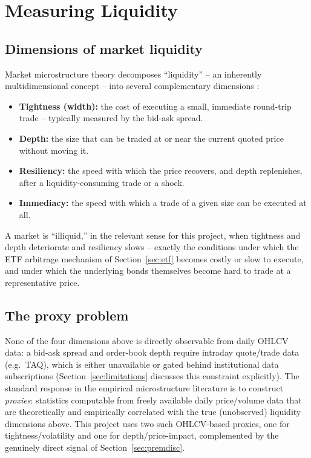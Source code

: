 \documentclass[11pt]{article}
\theoremstyle{definition}
\theoremstyle{remark}
\begin{document}
\section{Measuring Liquidity}
\label{sec:liquidity}

\subsection{Dimensions of market liquidity}

Market microstructure theory decomposes ``liquidity'' -- an inherently multidimensional concept -- into several complementary dimensions \cite{kyle1985continuous}:
\begin{itemize}
    \item \textbf{Tightness (width):} the cost of executing a small, immediate round-trip trade -- typically measured by the bid-ask spread.
    \item \textbf{Depth:} the size that can be traded at or near the current quoted price without moving it.
    \item \textbf{Resiliency:} the speed with which the price recovers, and depth replenishes, after a liquidity-consuming trade or a shock.
    \item \textbf{Immediacy:} the speed with which a trade of a given size can be executed at all.
\end{itemize}
A market is ``illiquid,'' in the relevant sense for this project, when tightness and depth deteriorate and resiliency slows -- exactly the conditions under which the ETF arbitrage mechanism of Section~\ref{sec:etf} becomes costly or slow to execute, and under which the underlying bonds themselves become hard to trade at a representative price.

\subsection{The proxy problem}

None of the four dimensions above is directly observable from daily OHLCV data: a bid-ask spread and order-book depth require intraday quote/trade data (e.g.\ TAQ), which is either unavailable or gated behind institutional data subscriptions (Section~\ref{sec:limitations} discusses this constraint explicitly). The standard response in the empirical microstructure literature is to construct \emph{proxies}: statistics computable from freely available daily price/volume data that are theoretically and empirically correlated with the true (unobserved) liquidity dimensions above. This project uses two such OHLCV-based proxies, one for tightness/volatility and one for depth/price-impact, complemented by the genuinely direct signal of Section~\ref{sec:premdisc}.
\end{document}
